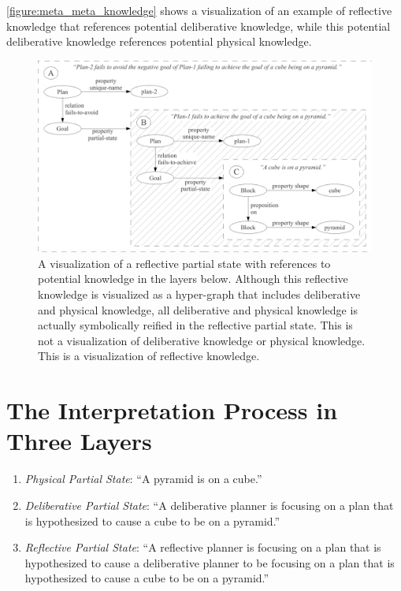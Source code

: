 {\mbox{\autoref{figure:meta_meta_knowledge}}} shows a visualization of
an example of reflective knowledge that references potential
deliberative knowledge, while this potential deliberative knowledge
references potential physical knowledge.
\begin{figure}
\centering
\includegraphics[width=12cm]{gfx/meta_meta_knowledge}
\caption[A visualization of a reflective partial state with references
  to potential knowledge in the layers below.]{A visualization of a
  reflective partial state with references to potential knowledge in
  the layers below.  Although this reflective knowledge is visualized
  as a hyper-graph that includes deliberative and physical knowledge,
  all deliberative and physical knowledge is actually symbolically
  reified in the reflective partial state.  This is not a
  visualization of deliberative knowledge or physical knowledge.  This
  is a visualization of reflective knowledge.}
\label{figure:meta_meta_knowledge}
\end{figure}

\section{The Interpretation Process in Three Layers}

\begin{enumerate}
\item{\emph{Physical Partial State}: ``A pyramid is on a cube.''}
\item{\emph{Deliberative Partial State}: ``A deliberative planner is
  focusing on a plan that is hypothesized to cause a cube to be on a
  pyramid.''}
\item{\emph{Reflective Partial State}: ``A reflective planner is
  focusing on a plan that is hypothesized to cause a deliberative
  planner to be focusing on a plan that is hypothesized to cause a
  cube to be on a pyramid.''}
\end{enumerate}

